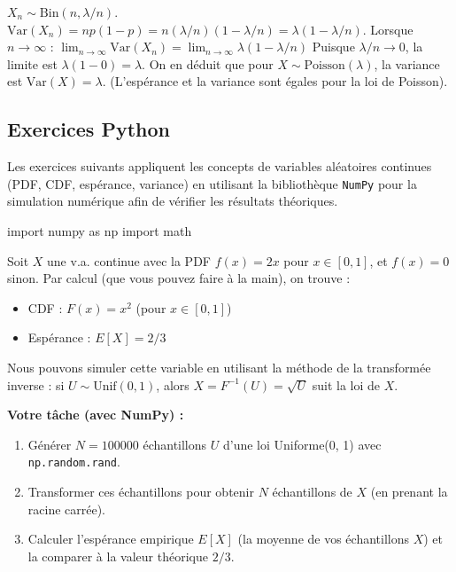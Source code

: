 \begin{correctionbox}
$X_n \sim \text{Bin}(n, \lambda/n)$.
$\text{Var}(X_n) = np(1-p) = n(\lambda/n)(1 - \lambda/n) = \lambda(1 - \lambda/n)$.
Lorsque $n \to \infty$ :
$\lim_{n \to \infty} \text{Var}(X_n) = \lim_{n \to \infty} \lambda(1 - \lambda/n)$
Puisque $\lambda/n \to 0$, la limite est $\lambda(1 - 0) = \lambda$.
On en déduit que pour $X \sim \text{Poisson}(\lambda)$, la variance est $\text{Var}(X) = \lambda$.
(L'espérance et la variance sont égales pour la loi de Poisson).
\end{correctionbox}

\subsection{Exercices Python}

Les exercices suivants appliquent les concepts de variables aléatoires continues (PDF, CDF, espérance, variance) en utilisant la bibliothèque \texttt{NumPy} pour la simulation numérique afin de vérifier les résultats théoriques.

\begin{codecell}
import numpy as np
import math
\end{codecell}

\begin{exercicebox}
Soit $X$ une v.a. continue avec la PDF $f(x) = 2x$ pour $x \in [0, 1]$, et $f(x)=0$ sinon.
Par calcul (que vous pouvez faire à la main), on trouve :
\begin{itemize}
    \item CDF : $F(x) = x^2$ (pour $x \in [0, 1]$)
    \item Espérance : $E[X] = 2/3$
\end{itemize}
Nous pouvons simuler cette variable en utilisant la méthode de la transformée inverse : si $U \sim \text{Unif}(0, 1)$, alors $X = F^{-1}(U) = \sqrt{U}$ suit la loi de $X$.

\textbf{Votre tâche (avec NumPy) :}
\begin{enumerate}
    \item Générer $N=100000$ échantillons $U$ d'une loi Uniforme(0, 1) avec \texttt{np.random.rand}.
    \item Transformer ces échantillons pour obtenir $N$ échantillons de $X$ (en prenant la racine carrée).
    \item Calculer l'espérance empirique $E[X]$ (la moyenne de vos échantillons $X$) et la comparer à la valeur théorique $2/3$.
\end{enumerate}
\end{exercicebox}


